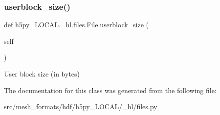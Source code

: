 \subsubsection{\texorpdfstring{userblock\+\_\+size()}{userblock\_size()}}
{\footnotesize\ttfamily def h5py\+\_\+\+L\+O\+C\+A\+L.\+\_\+hl.\+files.\+File.\+userblock\+\_\+size (\begin{DoxyParamCaption}\item[{}]{self }\end{DoxyParamCaption})}

\begin{DoxyVerb}User block size (in bytes) \end{DoxyVerb}
 

The documentation for this class was generated from the following file\+:\begin{DoxyCompactItemize}
\item 
src/mesh\+\_\+formats/hdf/h5py\+\_\+\+L\+O\+C\+A\+L/\+\_\+hl/files.\+py\end{DoxyCompactItemize}
